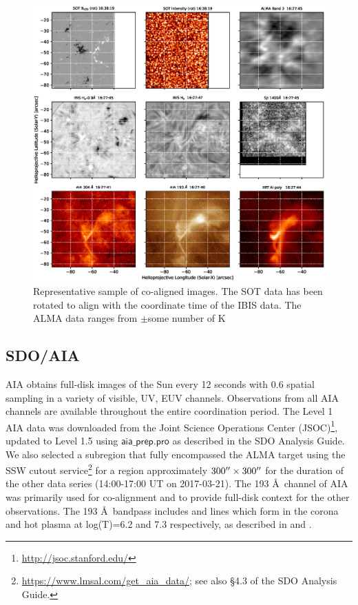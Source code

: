 \documentclass[twocolumn]{aastex62}
\newcommand{\code}[1]{\ensuremath{\textsf{#1}}}
\newcommand{\fnc}[1]{\code{#1}}
\begin{document}
\begin{figure}
    \centering
    \includegraphics[width=0.95\linewidth]{figures/IBISimg0108.eps}
    \caption{Representative sample of co-aligned images. The SOT data has been rotated to align with the coordinate time of the IBIS data. The ALMA data ranges from $\pm$some number of K}
    \label{fig:coordination2}
\end{figure}

\subsection{SDO/AIA}\label{sec:sdoaia}
AIA obtains full-disk images of the Sun every 12 seconds with 0.6\arcsec{} spatial sampling in a variety of visible, UV, EUV channels.
Observations from all AIA channels are available throughout the entire coordination period.
The Level 1 AIA data was downloaded from the Joint Science Operations Center (JSOC)\footnote{\url{http://jsoc.stanford.edu/}}, updated to Level 1.5 using \fnc{aia\_prep.pro} as described in the SDO Analysis Guide.
We also selected a subregion that fully encompassed the ALMA target using the SSW cutout service\footnote{\url{https://www.lmsal.com/get_aia_data/}; see also \S4.3 of the SDO Analysis Guide.} for a region approximately $300\mbox{$^{\prime\prime}$}\times300\mbox{$^{\prime\prime}$}$ for the duration of the other data series (14:00-17:00 UT on 2017-03-21).
The 193 \AA\ channel of AIA was primarily used for co-alignment and to provide full-disk context for the other observations.  
The 193 \AA\ bandpass includes  and  lines which form in the corona and hot plasma at log(T)=6.2 and 7.3 respectively, as described in \citet{2012Boerner} and \citet{2014Boerner}.
\end{document}
